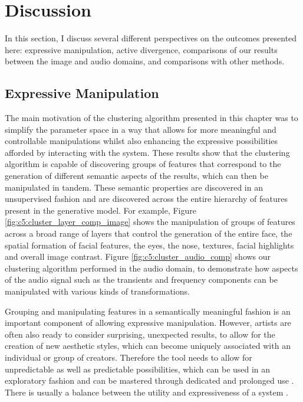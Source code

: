 \section{Discussion}

In this section, I discuss several different perspectives on the outcomes presented here: expressive manipulation, active divergence, comparisons of our results between the image and audio domains, and comparisons with other methods.

\subsection{Expressive Manipulation}

The main motivation of the clustering algorithm presented in this chapter was to simplify the parameter space in a way that allows for more meaningful and controllable manipulations whilst also enhancing the expressive possibilities afforded by interacting with the system. 
These results show that the clustering algorithm is capable of discovering groups of features that correspond to the generation of different semantic aspects of the results, which can then be manipulated in tandem. 
These semantic properties are discovered in an unsupervised fashion and are discovered across the entire hierarchy of features present in the generative model. 
For example, Figure \ref{fig:c5:cluster_layer_comp_image} shows the manipulation of groups of features across a broad range of layers that control the generation of the entire face, the spatial formation of facial features, the eyes, the nose, textures, facial highlights and overall image contrast. Figure \ref{fig:c5:cluster_audio_comp} shows our clustering algorithm performed in the audio domain, to demonstrate how aspects of the audio signal such as the transients and frequency components can be manipulated with various kinds of transformations.

Grouping and manipulating features in a semantically meaningful fashion is an important component of allowing expressive manipulation. 
However, artists are often also ready to consider surprising, unexpected results, to allow for the creation of new aesthetic styles, which can become uniquely associated with an individual or group of creators. 
Therefore the tool needs to allow for unpredictable as well as predictable possibilities, which can be used in an exploratory fashion and can be mastered through dedicated and prolonged use \citep{dobrian2006nime}. 
There is usually a balance between the utility and expressiveness of a system \citep{jacobs2017supporting}. 

